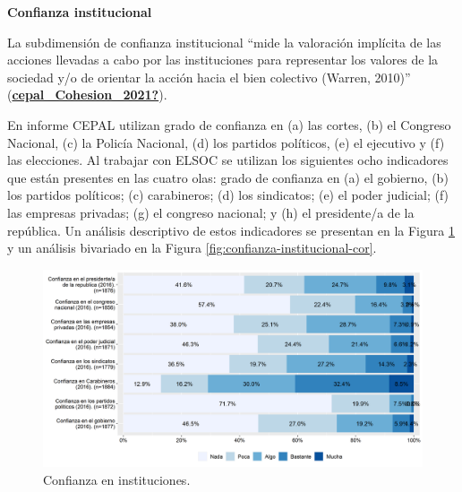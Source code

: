 \documentclass[
  12pt,
]{book}
\begin{document}
\textbf{Confianza institucional}

La subdimensión de confianza institucional ``mide la valoración implícita de las acciones llevadas a cabo por las instituciones para representar los valores de la sociedad y/o de orientar la acción hacia el bien colectivo (Warren, 2010)'' (\protect\hyperlink{ref-cepal_Cohesion_2021}{\textbf{cepal\_Cohesion\_2021?}}).

En informe CEPAL utilizan grado de confianza en (a) las cortes, (b) el Congreso Nacional, (c) la Policía Nacional, (d) los partidos políticos, (e) el ejecutivo y (f) las elecciones. Al trabajar con ELSOC se utilizan los siguientes ocho indicadores que están presentes en las cuatro olas: grado de confianza en (a) el gobierno, (b) los partidos políticos; (c) carabineros; (d) los sindicatos; (e) el poder judicial; (f) las empresas privadas; (g) el congreso nacional; y (h) el presidente/a de la república. Un análisis descriptivo de estos indicadores se presentan en la Figura \ref{fig:confianza-institucional} y un análisis bivariado en la Figura \ref{fig:confianza-institucional-cor}.

\begin{figure}[H]

{\centering \includegraphics[width=1\linewidth,height=1\textheight]{output/graphs/confianza-institucional} 

}

\caption{Confianza en instituciones.}\label{fig:confianza-institucional}
\end{figure}
\end{document}
